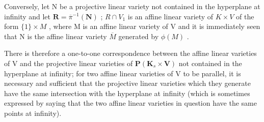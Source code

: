 Conversely, let N be a projective linear variety not contained in the hyperplane at infinity and let \(\mathbf{R} = \overline{\pi}^{-1}(\mathbf{N})\) ; \(R \cap V_{1}\) is an affine linear variety of \(K \times V\) of the form \(\{1\} \times M\) , where M is an affine linear variety of V and it is immediately seen that N is the affine linear variety \(\overline{M}\) generated by \(\phi(M)\) .

There is therefore a one-to-one correspondence between the affine linear varieties of V and the projective linear varieties of \(\mathbf{P}(\mathbf{K}_{s} \times \mathbf{V})\) not contained in the hyperplane at infinity; for two affine linear varieties of V to be parallel, it is necessary and sufficient that the projective linear varieties which they generate have the same intersection with the hyperplane at infinity (which is sometimes expressed by saying that the two affine linear varieties in question have the same points at infinity).


